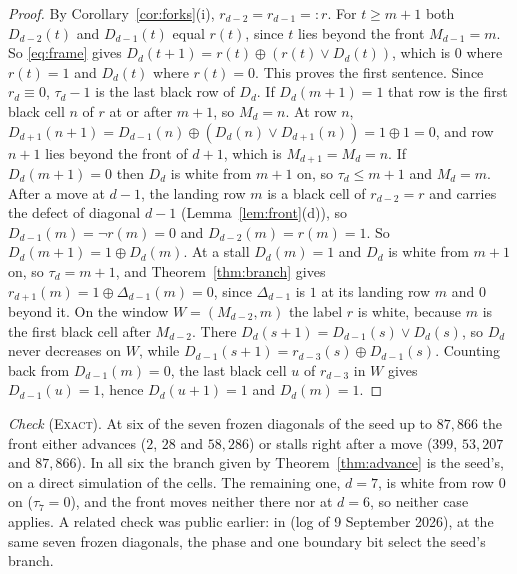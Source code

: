 \documentclass[11pt]{article}
\theoremstyle{definition}
\theoremstyle{remark}
\newcommand{\EXACT}{\textsc{Exact}}
\begin{document}
\begin{proof}
By Corollary~\ref{cor:forks}(i), $r_{d-2}=r_{d-1}=:r$. For $t\ge m+1$ both $D_{d-2}(t)$ and $D_{d-1}(t)$ equal $r(t)$, since $t$ lies beyond the front $M_{d-1}=m$. So \eqref{eq:frame} gives $D_d(t+1)=r(t)\oplus(r(t)\vee D_d(t))$, which is $0$ where $r(t)=1$ and $D_d(t)$ where $r(t)=0$. This proves the first sentence. Since $r_d\equiv0$, $\tau_d-1$ is the last black row of $D_d$. If $D_d(m+1)=1$ that row is the first black cell $n$ of $r$ at or after $m+1$, so $M_d=n$. At row $n$, $D_{d+1}(n+1)=D_{d-1}(n)\oplus(D_d(n)\vee D_{d+1}(n))=1\oplus1=0$, and row $n+1$ lies beyond the front of $d+1$, which is $M_{d+1}=M_d=n$. If $D_d(m+1)=0$ then $D_d$ is white from $m+1$ on, so $\tau_d\le m+1$ and $M_d=m$.
After a move at $d-1$, the landing row $m$ is a black cell of $r_{d-2}=r$ and carries the defect of diagonal $d-1$ (Lemma~\ref{lem:front}(d)), so $D_{d-1}(m)=\neg r(m)=0$ and $D_{d-2}(m)=r(m)=1$. So $D_d(m+1)=1\oplus D_d(m)$. At a stall $D_d(m)=1$ and $D_d$ is white from $m+1$ on, so $\tau_d=m+1$, and Theorem~\ref{thm:branch} gives $r_{d+1}(m)=1\oplus\Delta_{d-1}(m)=0$, since $\Delta_{d-1}$ is $1$ at its landing row $m$ and $0$ beyond it. On the window $W=(M_{d-2},m)$ the label $r$ is white, because $m$ is the first black cell after $M_{d-2}$. There $D_d(s+1)=D_{d-1}(s)\vee D_d(s)$, so $D_d$ never decreases on $W$, while $D_{d-1}(s+1)=r_{d-3}(s)\oplus D_{d-1}(s)$. Counting back from $D_{d-1}(m)=0$, the last black cell $u$ of $r_{d-3}$ in $W$ gives $D_{d-1}(u)=1$, hence $D_d(u+1)=1$ and $D_d(m)=1$.
\end{proof}

\emph{Check} (\EXACT). At six of the seven frozen diagonals of the seed up to $87{,}866$ the front either advances ($2$, $28$ and $58{,}286$) or stalls right after a move ($399$, $53{,}207$ and $87{,}866$). In all six the branch given by Theorem~\ref{thm:advance} is the seed's, on a direct simulation of the cells. The remaining one, $d=7$, is white from row $0$ on ($\tau_7=0$), and the front moves neither there nor at $d=6$, so neither case applies. A related check was public earlier: in \cite{Pat} (log of 9 September 2026), at the same seven frozen diagonals, the phase and one boundary bit select the seed's branch.
\end{document}
